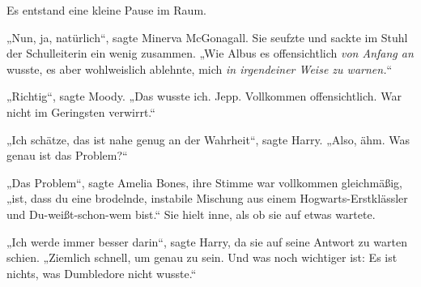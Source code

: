 Es entstand eine kleine Pause im Raum.

„Nun, ja, natürlich“, sagte Minerva McGonagall.
Sie seufzte und sackte im Stuhl der Schulleiterin ein wenig zusammen.
„Wie Albus es offensichtlich \emph{von Anfang an} wusste, es aber wohlweislich ablehnte, mich \emph{in irgendeiner Weise zu warnen.}“

„Richtig“, sagte Moody.
„Das wusste ich. Jepp. Vollkommen offensichtlich. War nicht im Geringsten verwirrt.“

„Ich schätze, das ist nahe genug an der Wahrheit“, sagte Harry.
„Also, ähm. Was genau ist das Problem?“

„Das Problem“, sagte Amelia Bones, ihre Stimme war vollkommen gleichmäßig, „ist, dass du eine brodelnde, instabile Mischung aus einem Hogwarts-Erstklässler und Du-weißt-schon-wem bist.“
Sie hielt inne, als ob sie auf etwas wartete.

„Ich werde immer besser darin“, sagte Harry, da sie auf seine Antwort zu warten schien.
„Ziemlich schnell, um genau zu sein. Und was noch wichtiger ist: Es ist nichts, was Dumbledore nicht wusste.“

